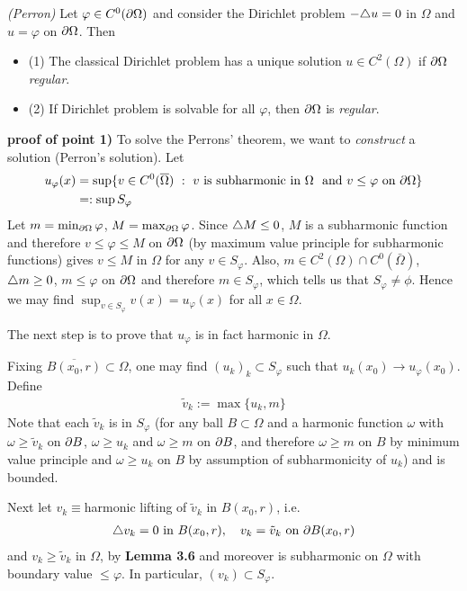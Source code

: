 \documentclass[12pt,a4paper]{article}
\newenvironment{proof}
{\begin{changemargin}{0.5cm}{0.5cm} 
	}%
	{\end{changemargin}
}
\renewenvironment{i}
{\begin{itemize} 
	}%
	{\end{itemize}
}
\begin{document}
\thm \emph{(Perron)} Let $\varphi \in C^0 (\partial \Omega)$ and consider the Dirichlet problem $-\triangle u =0$ in $\Omega$ and $u=\varphi$ on $\partial \Omega$. Then
\begin{i}
\item[(1)] The classical Dirichlet problem has a unique solution $u\in C^2(\Omega)$ if $\partial \Omega$ \emph{regular}.
\item[(2)] If Dirichlet problem is solvable for all $\varphi$, then $\partial \Omega$ is \emph{regular}.
\end{i}
\begin{proof}
\textbf{proof of point 1)} To solve the Perrons' theorem, we want to \emph{construct} a solution (Perron's solution). Let
\begin{align*}
u_{\varphi}(x) &= \sup \{ v\in C^0(\overline{\Omega})\,\, :\,\, v \text{ is subharmonic in } \Omega\,\, \text{ and} \,\,v\leq \varphi \text{ on }\partial \Omega \} \\
&=: \sup S_{\varphi}
\end{align*}
Let $m = \min_{\partial \Omega} \varphi$, $M = \max_{\partial \Omega} \varphi$. Since $\triangle M \leq 0$, $M$ is a subharmonic function and therefore $v\leq \varphi \leq M$ on $\partial \Omega$ (by maximum value principle for subharmonic functions) gives $v\leq M$ in $\Omega$ for any $v\in S_{\varphi}$. Also, $m\in C^2(\Omega) \cap C^0(\bar{\Omega})$, $\triangle m \geq 0$, $m\leq \varphi$ on $\partial \Omega$ and therefore $m\in S_{\varphi}$, which tells us that $S_{\varphi} \neq \phi$. Hence we may find $\sup_{v\in S_{\varphi}} v(x) = u_{\varphi}(x)$ for all $x\in \Omega$.
\s

The next step is to prove that $u_{\varphi}$ is in fact harmonic in $\Omega$.
\s

Fixing $\overline{B(x_0, r)} \subset \Omega$, one may find $(u_k)_k \subset S_{\varphi}$ such that $u_k(x_0) \rightarrow u_{\varphi}(x_0)$. Define
\begin{align*}
\tilde{v}_k := \max \{u_k, m\}
\end{align*}
Note that each $\tilde{v}_k$ is in $S_{\varphi}$ (for any ball $B\subset \Omega$ and a harmonic function $\omega$ with $\omega \geq \tilde{v}_k$ on $\partial B$, $\omega \geq u_k$ and $\omega \geq m$ on $\partial B$, and therefore $\omega \geq m$ on $B$ by minimum value principle and $\omega \geq u_k$ on $B$ by assumption of subharmonicity of $u_k$) and is bounded.

\quad Next let $v_k \equiv$harmonic lifting of $\tilde{v}_k$ in $B(x_0, r)$, i.e. 
\begin{align*}
\triangle v_k =0 \text{ in }B(x_0,r), \quad v_k = \tilde{v}_k \text{ on } \partial B(x_0,r)
\end{align*}
and $v_k \geq \tilde{v}_k$ in $\Omega$, by \textbf{Lemma 3.6} and moreover is subharmonic on $\Omega$ with boundary value $\leq \varphi$. In particular, $(v_k) \subset S_{\varphi}$.
\s


\end{proof}
\end{document}
